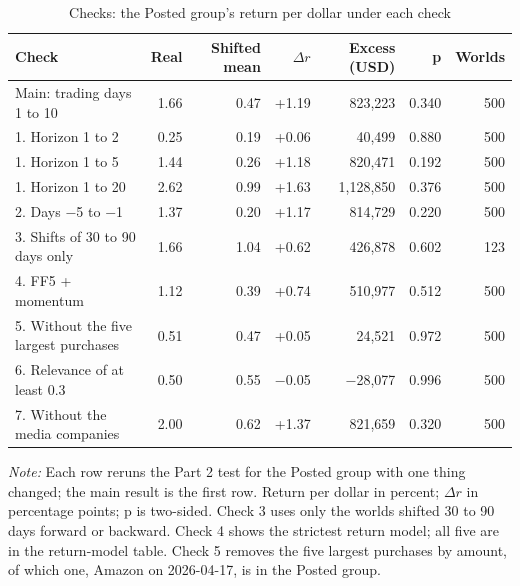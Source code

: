 \begin{table}[htbp]
\centering
\small
\setlength{\tabcolsep}{4pt}
\caption{Checks: the Posted group's return per dollar under each check}
\label{tab:robustness}
\begin{tabular}{lrrrrrr}
\toprule
Check & Real & Shifted mean & $\Delta r$ & Excess (USD) & p & Worlds \\
\midrule
Main: trading days 1 to 10 & 1.66 & 0.47 & +1.19 & 823,223 & 0.340 & 500 \\
\midrule
1. Horizon 1 to 2 & 0.25 & 0.19 & +0.06 & 40,499 & 0.880 & 500 \\
1. Horizon 1 to 5 & 1.44 & 0.26 & +1.18 & 820,471 & 0.192 & 500 \\
1. Horizon 1 to 20 & 2.62 & 0.99 & +1.63 & 1,128,850 & 0.376 & 500 \\
2. Days $-$5 to $-$1 & 1.37 & 0.20 & +1.17 & 814,729 & 0.220 & 500 \\
3. Shifts of 30 to 90 days only & 1.66 & 1.04 & +0.62 & 426,878 & 0.602 & 123 \\
4. FF5 + momentum & 1.12 & 0.39 & +0.74 & 510,977 & 0.512 & 500 \\
5. Without the five largest purchases & 0.51 & 0.47 & +0.05 & 24,521 & 0.972 & 500 \\
6. Relevance of at least 0.3 & 0.50 & 0.55 & $-$0.05 & $-$28,077 & 0.996 & 500 \\
7. Without the media companies & 2.00 & 0.62 & +1.37 & 821,659 & 0.320 & 500 \\
\bottomrule
\end{tabular}
\par\medskip
\begin{minipage}{\linewidth}\footnotesize\textit{Note:} Each row reruns the Part 2 test for the Posted group with one thing changed; the main result is the first row. Return per dollar in percent; $\Delta r$ in percentage points; p is two-sided. Check 3 uses only the worlds shifted 30 to 90 days forward or backward. Check 4 shows the strictest return model; all five are in the return-model table. Check 5 removes the five largest purchases by amount, of which one, Amazon on 2026-04-17, is in the Posted group.\end{minipage}
\end{table}
